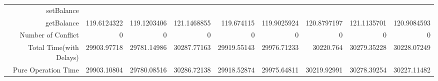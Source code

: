 \begin{landscape}
\begin{table}[htbp]
\begin{tabular}{rrrrrrrrr}
    \cline{1-9}
    setBalance &       &       &       &       &       &       &       &  \\
    getBalance & 119.6124322 & 119.1203406 & 121.1468855 & 119.674115 & 119.9025924 & 120.8797197 & 121.1135701 & 120.9084593 \\
    Number of Conflict & 0     & 0     & 0     & 0     & 0     & 0     & 0     & 0 \\
    Total Time(with Delays) & 29903.97718 & 29781.14986 & 30287.77163 & 29919.55143 & 29976.71233 & 30220.764 & 30279.35228 & 30228.07249 \\
    Pure Operation Time & 29903.10804 & 29780.08516 & 30286.72138 & 29918.52874 & 29975.64811 & 30219.92991 & 30278.39254 & 30227.11482 \\
    \bottomrule
    \end{tabular}%
  \label{tab:reads RMIOnly}%
\end{table}%
\end{landscape}





